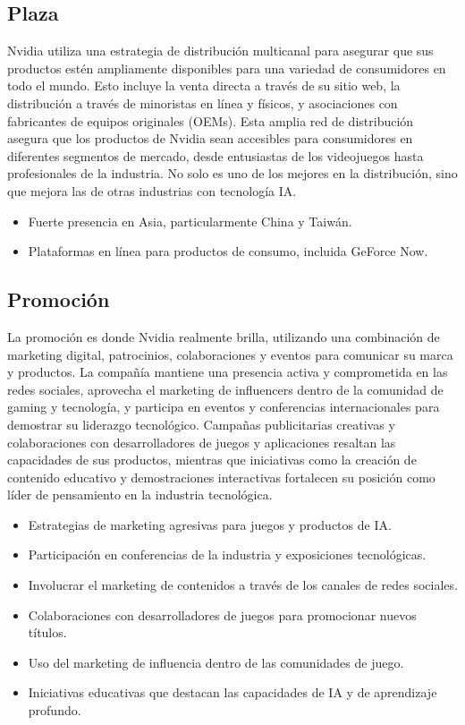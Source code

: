 \documentclass{article}
\begin{document}
\subsection{Plaza}

Nvidia utiliza una estrategia de distribución multicanal para asegurar que sus productos estén ampliamente disponibles para una variedad de consumidores en todo el mundo. Esto incluye la venta directa a través de su sitio web, la distribución a través de minoristas en línea y físicos, y asociaciones con fabricantes de equipos originales (OEMs). Esta amplia red de distribución asegura que los productos de Nvidia sean accesibles para consumidores en diferentes segmentos de mercado, desde entusiastas de los videojuegos hasta profesionales de la industria. No solo es uno de los mejores en la distribución, sino que mejora las de otras industrias con tecnología IA. 

\begin{itemize}
  \item Fuerte presencia en Asia, particularmente China y Taiwán.
  \item Plataformas en línea para productos de consumo, incluida GeForce Now.
\end{itemize}

\subsection{Promoción}

La promoción es donde Nvidia realmente brilla, utilizando una combinación de marketing digital, patrocinios, colaboraciones y eventos para comunicar su marca y productos. La compañía mantiene una presencia activa y comprometida en las redes sociales, aprovecha el marketing de influencers dentro de la comunidad de gaming y tecnología, y participa en eventos y conferencias internacionales para demostrar su liderazgo tecnológico. Campañas publicitarias creativas y colaboraciones con desarrolladores de juegos y aplicaciones resaltan las capacidades de sus productos, mientras que iniciativas como la creación de contenido educativo y demostraciones interactivas fortalecen su posición como líder de pensamiento en la industria tecnológica. 

\begin{itemize}
  \item Estrategias de marketing agresivas para juegos y productos de IA.
  \item Participación en conferencias de la industria y exposiciones tecnológicas.
  \item Involucrar el marketing de contenidos a través de los canales de redes sociales.
  \item Colaboraciones con desarrolladores de juegos para promocionar nuevos títulos.
  \item Uso del marketing de influencia dentro de las comunidades de juego.
  \item Iniciativas educativas que destacan las capacidades de IA y de aprendizaje profundo.
\end{itemize}
\end{document}
